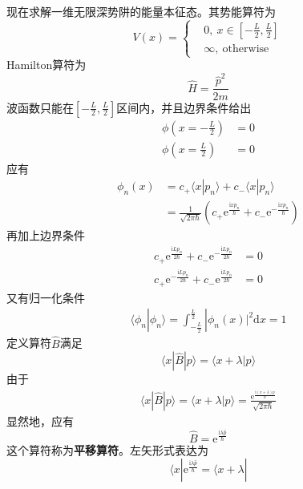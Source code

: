 \documentclass[12pt]{article}
\begin{document}
    现在求解一维无限深势阱的能量本征态。其势能算符为
    \begin{equation*}
        V(x) = \left \{
            \begin{aligned}
                &0,\ x\in [-\frac L2, \frac L2 ]\\
                &\infty, \ \mathrm{otherwise}
            \end{aligned}
            \right.
    \end{equation*}
    Hamilton算符为
    \begin{equation*}
        \hat{H} = \frac {\hat{p}^2}{2m}
    \end{equation*}
    波函数只能在$[-\frac L2, \frac L2 ]$区间内，并且边界条件给出
    \begin{align*}
        \phi(x = -\frac L2) &= 0\\
        \phi(x = \frac L2) &= 0
    \end{align*}
    应有
    \begin{align*}
        \phi_n(x) &= c_+ \langle x|p_n\rangle + c_- \langle x|p_n\rangle\\
        &= \frac 1{\sqrt{2\pi \hbar}}(c_+\mathrm{e}^{\frac {\mathrm{i}xp_n}{\hbar}}+c_-\mathrm{e}^{-\frac {\mathrm{i}xp_n}{\hbar}})
    \end{align*}
    再加上边界条件
    \begin{align*}
        c_+\mathrm{e}^{\frac {\mathrm{i}Lp_n}{2\hbar}}+c_-\mathrm{e}^{-\frac {\mathrm{i}Lp_n}{2\hbar}} &= 0\\
        c_+\mathrm{e}^{-\frac {\mathrm{i}Lp_n}{2\hbar}}+c_-\mathrm{e}^{\frac {\mathrm{i}Lp_n}{2\hbar}} &= 0
    \end{align*}
    又有归一化条件
    \begin{align*}
        \langle \phi_n | \phi_n \rangle = \int_{-\frac L2}^{\frac L2} |\phi_n(x)|^2 \mathrm{d}x = 1
    \end{align*}
    定义算符$\hat{B}$满足
    \[ \langle x|\hat{B}| p \rangle = \langle x+\lambda |p\rangle \]
    由于
    \begin{align*}
        \langle x|\hat{B}| p \rangle = \langle x+\lambda |p\rangle = \frac {\mathrm{e}^{\frac {\mathrm{i}(x+\lambda)p}{\hbar}}}{\sqrt{2\pi\hbar}}
    \end{align*}
    显然地，应有
    \begin{equation*}
        \hat{B} = \mathrm{e}^{\frac {\mathrm{i}\lambda \hat{p}}{\hbar}}
    \end{equation*}
    这个算符称为\textbf{平移算符}。左矢形式表达为
    \[ \langle x| \mathrm{e}^{\frac {\mathrm{i}\lambda \hat{p}}{\hbar}} = \langle x+\lambda| \]
\end{document}
